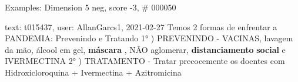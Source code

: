 \begin{frame}{Examples: Dimension 5 neg, score -3, \# 000050}
\footnotesize
\begin{alertblock}{text: t015437, user: AllanGarcs1, 2021-02-27}
Temos 2 formas de enfrentar a PANDEMIA: Prevenindo e Tratando 1° ) PREVENINDO - 
VACINAS, lavagem da mão, álcool em gel, \textbf{máscara} , NÃO aglomerar, 
\textbf{distanciamento} \textbf{social} e IVERMECTINA 2° ) TRATAMENTO - Tratar 
precocemente os doentes com Hidroxicloroquina + Ivermectina + Azitromicina 
\end{alertblock}
\end{frame}
